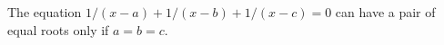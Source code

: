 The equation $1/(x - a) + 1/(x - b) + 1/(x - c) = 0$ can have a pair  of
equal roots only if $a = b = c$. 


